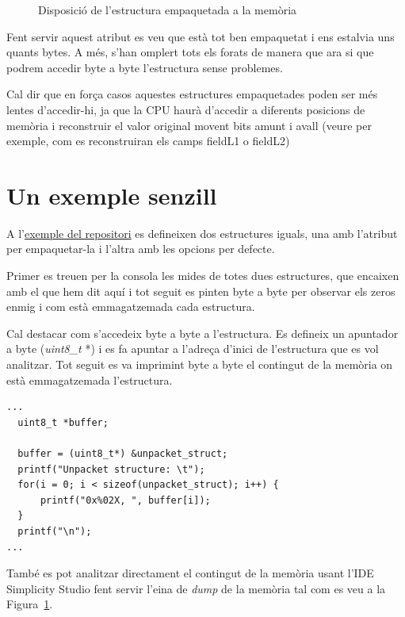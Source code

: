 \begin{figure}
 \centering
 \caption{Disposició de l'estructura empaquetada a la memòria}
 \label{fig:UnpackedMemoryStructure}
\end{figure}

Fent servir aquest atribut es veu que està tot ben empaquetat i ens estalvia uns quants bytes. A més, s'han omplert tots els forats de manera que ara si que podrem accedir byte a byte l'estructura sense problemes.

Cal dir que en força casos aquestes estructures empaquetades poden ser més lentes d'accedir-hi, ja que la CPU haurà d'accedir a diferents posicions de memòria i reconstruir el valor original movent bits amunt i avall (veure per exemple, com es reconstruiran els camps fieldL1 o fieldL2)

\section{Un exemple senzill}

A l'\href{https://github.com/mariusmm/cursembedded/tree/master/Simplicity/Structures}{exemple del repositori} es defineixen dos estructures iguals, una amb l'atribut per empaquetar-la i l'altra amb les opcions per defecte.

Primer es treuen per la consola les mides de totes dues estructures, que encaixen amb el que hem dit aquí i tot seguit es pinten byte a byte per observar els zeros enmig i com està emmagatzemada cada estructura.

Cal destacar com s'accedeix byte a byte a l'estructura. Es defineix un apuntador a byte ({\em uint8\_t} *) i es fa apuntar a l'adreça d'inici de l'estructura que es vol analitzar. Tot seguit es va imprimint byte a byte el contingut de la memòria on està emmagatzemada l'estructura.

\begin{lstlisting}[style=customc,caption={Mostrant una estructura {\em byte} a {\em byte}},label=struct_example]
...
  uint8_t *buffer;

  buffer = (uint8_t*) &unpacket_struct;
  printf("Unpacket structure: \t");
  for(i = 0; i < sizeof(unpacket_struct); i++) {
	  printf("0x%02X, ", buffer[i]);
  }
  printf("\n");
...
\end{lstlisting}


També es pot analitzar directament el contingut de la memòria usant l'IDE Simplicity Studio fent servir l'eina de {\em dump} de la memòria tal com es veu a la Figura~\ref{fig:UnpackedMemoryStructure}.

